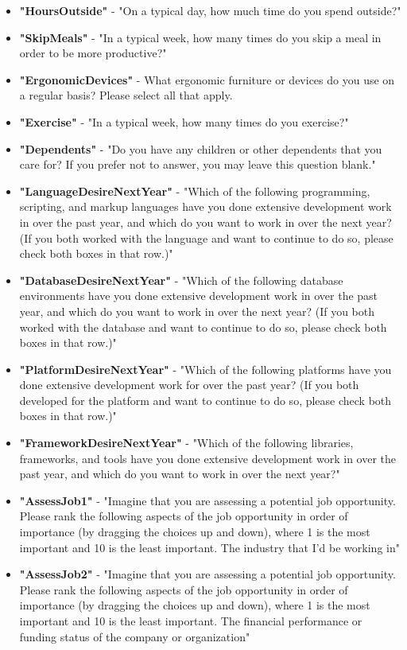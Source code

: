\begin{appendices}
\begin{itemize}
        \item \textbf{"HoursOutside"} - "On a typical day, how much time do you spend outside?"
        \item \textbf{"SkipMeals"} - "In a typical week, how many times do you skip a meal in order to be more productive?"
        \item \textbf{"ErgonomicDevices"} - What ergonomic furniture or devices do you use on a regular basis? Please select all that apply.
        \item \textbf{"Exercise"} - "In a typical week, how many times do you exercise?"
        \item \textbf{"Dependents"} - "Do you have any children or other dependents that you care for? If you prefer not to answer, you may leave this question blank."
        \item \textbf{"LanguageDesireNextYear"} - "Which of the following programming, scripting, and markup languages have you done extensive development work in over the past year, and which do you want to work in over the next year?  (If you both worked with the language and want to continue to do so, please check both boxes in that row.)"
        \item \textbf{"DatabaseDesireNextYear"} - "Which of the following database environments have you done extensive development work in over the past year, and which do you want to work in over the next year?   (If you both worked with the database and want to continue to do so, please check both boxes in that row.)"
        \item \textbf{"PlatformDesireNextYear"} - "Which of the following platforms have you done extensive development work for over the past year?   (If you both developed for the platform and want to continue to do so, please check both boxes in that row.)"
        \item \textbf{"FrameworkDesireNextYear"} - "Which of the following libraries, frameworks, and tools have you done extensive development work in over the past year, and which do you want to work in over the next year?"
        \item \textbf{"AssessJob1"} - "Imagine that you are assessing a potential job opportunity. Please rank the following aspects of the job opportunity in order of importance (by dragging the choices up and down), where 1 is the most important and 10 is the least important. The industry that I'd be working in"
        \item \textbf{"AssessJob2"} - "Imagine that you are assessing a potential job opportunity. Please rank the following aspects of the job opportunity in order of importance (by dragging the choices up and down), where 1 is the most important and 10 is the least important. The financial performance or funding status of the company or organization"

\end{itemize}
\end{appendices}
